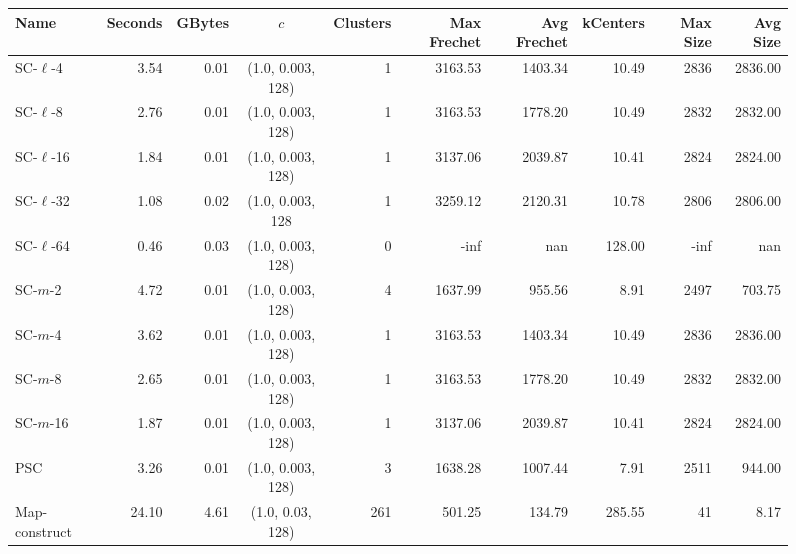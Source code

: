 \begin{figure}[h] \begin{center}
        \begin{minipage}{\textwidth}
    {
    \begin{tabular}{@{}lrrcrrrrrr@{}}
        \toprule
        Name & Seconds & GBytes & $c$ & Clusters & Max Frechet & Avg Frechet & kCenters & Max Size & Avg Size\\
        \midrule
        SC-$\ell$-4 & 3.54 & 0.01 & (1.0, 0.003, 128) & 1 & 3163.53 & 1403.34 & 10.49 & 2836 & 2836.00\\
        SC-$\ell$-8 & 2.76 & 0.01 & (1.0, 0.003, 128) & 1 & 3163.53 & 1778.20 & 10.49 & 2832 & 2832.00\\
        SC-$\ell$-16 & 1.84 & 0.01 & (1.0, 0.003, 128) & 1 & 3137.06 & 2039.87 & 10.41 & 2824 & 2824.00\\
        SC-$\ell$-32 & 1.08 & 0.02 & (1.0, 0.003, 128 & 1 & 3259.12 & 2120.31 & 10.78 & 2806 & 2806.00\\
        SC-$\ell$-64 & 0.46 & 0.03 & (1.0, 0.003, 128) & 0 & -inf & nan & 128.00 & -inf & nan\\
        SC-$m$-2 & 4.72 & 0.01 & (1.0, 0.003, 128) & 4 & 1637.99 & 955.56 & 8.91 & 2497 & 703.75\\
        SC-$m$-4 & 3.62 & 0.01 & (1.0, 0.003, 128) & 1 & 3163.53 & 1403.34 & 10.49 & 2836 & 2836.00\\
        SC-$m$-8 & 2.65 & 0.01 & (1.0, 0.003, 128) & 1 & 3163.53 & 1778.20 & 10.49 & 2832 & 2832.00\\
        SC-$m$-16 & 1.87 & 0.01 & (1.0, 0.003, 128) & 1 & 3137.06 & 2039.87 & 10.41 & 2824 & 2824.00\\
        PSC & 3.26 & 0.01 & (1.0, 0.003, 128) & 3 & 1638.28 & 1007.44 & 7.91 & 2511 & 944.00\\
        Map-construct & 24.10 & 4.61 & (1.0, 0.03, 128) & 261 & 501.25 & 134.79 & 285.55 & 41 & 8.17\\
        \bottomrule
    \end{tabular}}


\end{minipage}
\end{center}
\end{figure}
